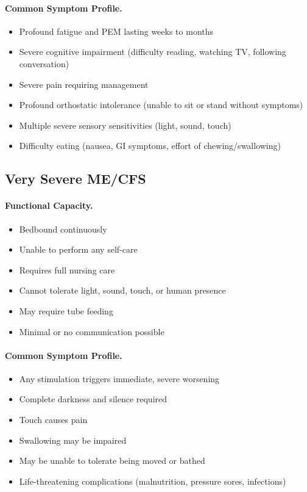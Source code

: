 \paragraph{Common Symptom Profile.}
\begin{itemize}
    \item Profound fatigue and PEM lasting weeks to months
    \item Severe cognitive impairment (difficulty reading, watching TV, following conversation)
    \item Severe pain requiring management
    \item Profound orthostatic intolerance (unable to sit or stand without symptoms)
    \item Multiple severe sensory sensitivities (light, sound, touch)
    \item Difficulty eating (nausea, GI symptoms, effort of chewing/swallowing)
\end{itemize}

\subsection{Very Severe ME/CFS}
\label{subsec:very-severe-mecfs}

\paragraph{Functional Capacity.}
\begin{itemize}
    \item Bedbound continuously
    \item Unable to perform any self-care
    \item Requires full nursing care
    \item Cannot tolerate light, sound, touch, or human presence
    \item May require tube feeding
    \item Minimal or no communication possible
\end{itemize}

\paragraph{Common Symptom Profile.}
\begin{itemize}
    \item Any stimulation triggers immediate, severe worsening
    \item Complete darkness and silence required
    \item Touch causes pain
    \item Swallowing may be impaired
    \item May be unable to tolerate being moved or bathed
    \item Life-threatening complications (malnutrition, pressure sores, infections)
\end{itemize}

